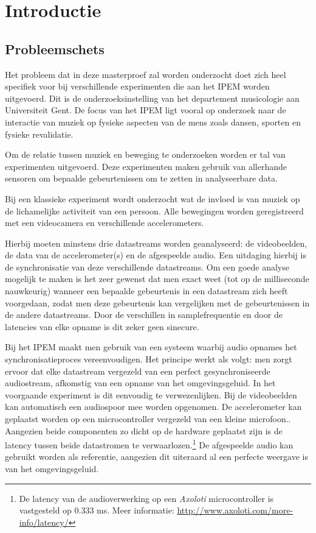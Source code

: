 \chapter{Introductie}

\section{Probleemschets}

Het probleem dat in deze masterproef zal worden onderzocht doet zich heel specifiek voor bij verschillende experimenten die aan het IPEM worden uitgevoerd. Dit is de onderzoeksinstelling van het departement musicologie aan Universiteit Gent. De focus van het IPEM ligt vooral op onderzoek naar de interactie van muziek op fysieke aspecten van de mens zoals dansen, sporten en fysieke revalidatie. \cite{ipem2016}

Om de relatie tussen muziek en beweging te onderzoeken worden er tal van experimenten uitgevoerd. Deze experimenten maken gebruik van allerhande sensoren om bepaalde gebeurtenissen om te zetten in analyseerbare data. 

Bij een klassieke experiment wordt onderzocht wat de invloed is van muziek op de lichamelijke activiteit van een persoon. Alle bewegingen worden geregistreerd met een videocamera en verschillende accelerometers.

Hierbij moeten minstens drie datastreams worden geanalyseerd: de videobeelden, de data van de accelerometer(s) en de afgespeelde audio. Een  uitdaging hierbij is de synchronisatie van deze verschillende datastreams. Om een goede analyse mogelijk te maken is het zeer gewenst dat men exact weet (tot op de milliseconde nauwkeurig) wanneer een bepaalde gebeurtenis in een datastream zich heeft voorgedaan, zodat men deze gebeurtenis kan vergelijken met de gebeurtenissen in de andere datastreams. Door de verschillen in samplefrequentie en door de latencies van elke opname is dit zeker geen sinecure. \cite{six2015multimodal}

Bij het IPEM maakt men gebruik van een systeem waarbij audio opnames het synchronisatieproces vereenvoudigen. Het principe werkt als volgt: men zorgt ervoor dat elke datastream vergezeld van een perfect gesynchroniseerde audiostream, afkomstig van een opname van het omgevingsgeluid. In het voorgaande experiment is dit eenvoudig te verwezenlijken. Bij de videobeelden kan automatisch een audiospoor mee worden opgenomen. De accelerometer kan geplaatst worden op een microcontroller vergezeld van een kleine microfoon.. Aangezien beide componenten zo dicht op de hardware geplaatst zijn is de latency tussen beide datastromen te verwaarlozen.\footnote{De latency van de audioverwerking op een \textit{Axoloti} microcontroller is vastgesteld op 0.333 ms. Meer informatie: \url{http://www.axoloti.com/more-info/latency/}} De afgespeelde audio kan gebruikt worden als referentie, aangezien dit uiteraard al een perfecte weergave is van het omgevingsgeluid. 

